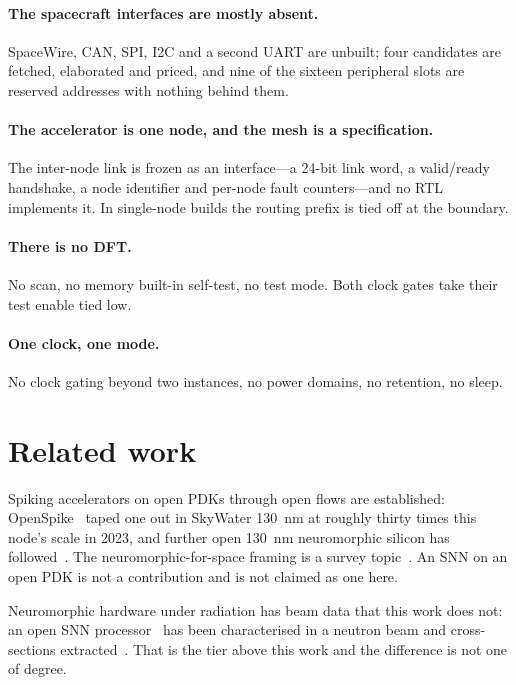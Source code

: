 \documentclass[11pt,a4paper]{article}
\begin{document}
\paragraph{The spacecraft interfaces are mostly absent.} SpaceWire, CAN,
SPI, I2C and a second UART are unbuilt; four candidates are fetched,
elaborated and priced, and nine of the sixteen peripheral slots are
reserved addresses with nothing behind them.

\paragraph{The accelerator is one node, and the mesh is a
specification.} The inter-node link is frozen as an interface---a
\num{24}-bit link word, a valid/ready handshake, a node identifier and
per-node fault counters---and no RTL implements it. In single-node
builds the routing prefix is tied off at the boundary.

\paragraph{There is no DFT.} No scan, no memory built-in self-test, no
test mode. Both clock gates take their test enable tied low.

\paragraph{One clock, one mode.} No clock gating beyond two instances,
no power domains, no retention, no sleep.

\section{Related work}
\label{sec:related}

Spiking accelerators on open PDKs through open flows are established:
OpenSpike~\cite{openspike2023} taped one out in SkyWater
\SI{130}{\nano\meter} at roughly thirty times this node's scale in 2023,
and further open \SI{130}{\nano\meter} neuromorphic silicon has
followed~\cite{kumaresan2026}. The neuromorphic-for-space framing is a
survey topic~\cite{naoukin2023}. An SNN on an
open PDK is not a contribution and is not claimed as one here.

Neuromorphic hardware under radiation has beam data that this work does
not: an open SNN processor~\cite{frenkel2019} has been characterised in a
neutron beam and cross-sections extracted~\cite{nijsink2026}. That is the tier above this work and the
difference is not one of degree.
\end{document}
